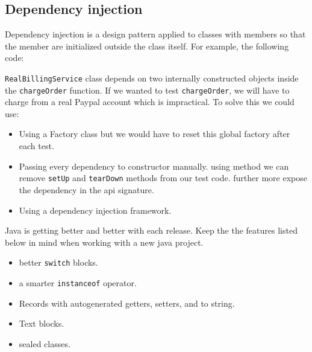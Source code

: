 \documentclass[a4paper]{article}
\begin{document}
\subsection*{Dependency injection}

Dependency injection is a design pattern applied to classes with members so that the member are initialized outside the class
itself. For example, the following code:



\lstinline{RealBillingService} class depends on two internally constructed objects inside the \lstinline{chargeOrder}
function. If we wanted to test \lstinline{chargeOrder}, we will have to charge from a real Paypal account which is
impractical. To solve this we could use:

\begin{itemize}
    \item Using a Factory class but we would have to reset this global factory after each test.
    \item Passing every dependency to constructor manually. using method we can remove \lstinline{setUp} and \lstinline{tearDown}
          methods from our test code. further more expose the dependency in the api signature.
    \item Using a dependency injection framework.
\end{itemize}

Java is getting better and better with each release. Keep the the features listed below in mind when working with a new
java project.
\begin{itemize}
    \item better \lstinline{switch} blocks.
    \item a smarter \lstinline{instanceof} operator.
    \item Records with autogenerated getters, setters, and to string.
    \item Text blocks.
    \item sealed classes.
\end{itemize}
\end{document}
